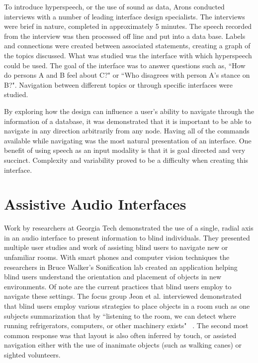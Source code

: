 To introduce hyperspeech, or the use of sound as data, Arons conducted interviews
with a number of leading interface design specialists.  The interviews were
brief in nature, completed in approximately 5 minutes.  The speech recorded
from the interview was then processed off line and put into a data base.
Labels and connections were created between associated statements, creating a
graph of the topics discussed.  What was studied was the interface with which
hyperspeech could be used.  The goal of the interface was to answer questions
such as, ``How do persons A and B feel about C?" or ``Who disagrees with person
A's stance on B?".  Navigation between different topics or through specific
interfaces were studied.

By exploring how the design can influence a user's ability to navigate through
the information of a database, it was demonstrated that it is important to
be able to navigate in any direction arbitrarily from any node. Having all of
the commands available while navigating was the most natural presentation of
an interface.  One benefit of using speech as an input modality is that it is
goal directed and very succinct.  Complexity and variability proved to be a
difficulty when creating this interface.

\section{                 Assistive Audio Interfaces                           }

Work by researchers at Georgia Tech demonstrated the use of a single, radial axis
in an audio interface to present information to blind individuals. They presented
multiple user studies and work of assisting blind users to navigate new or unfamiliar
rooms.  With smart phones and computer vision techniques the researchers in
Bruce Walker's Sonification lab created an application helping blind users understand
the orientation and placement of objects in new environments. Of note are the
current practices that blind users employ to navigate these settings. The focus group
Jeon et al. interviewed demonstrated that blind users employ
various strategies to place objects in a room such as one subjects summarization
that by ``listening to the room, we can detect where running refrigerators,
computers, or other machinery exists" ~\cite{jeon2012listen2droom}. The second
most common response was that layout is also often inferred by touch, or assisted
navigation either with the use of inanimate objects (such as walking canes)
or sighted volunteers.

